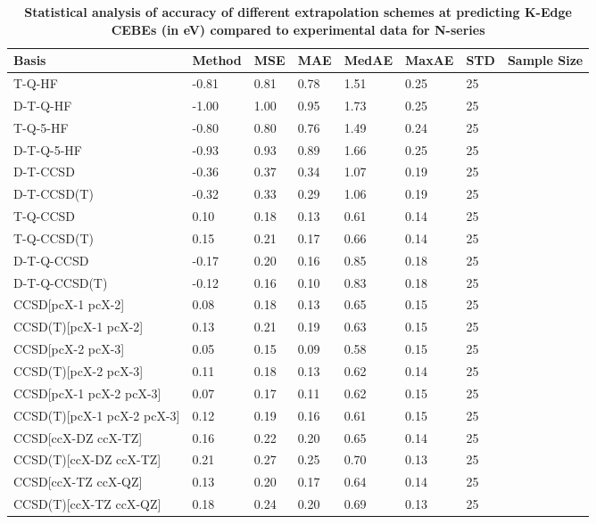 \begin{table}
  \caption{\textbf{Statistical analysis of accuracy of different extrapolation schemes at predicting K-Edge CEBEs (in eV) compared to experimental data for N-series}}
  \label{tbl:extrap-scheme-summary-n}
  \begin{tabular}{l l l l l l l l }
    \toprule
    \textbf{Basis} & \textbf{Method} & \textbf{MSE} & \textbf{MAE} & \textbf{MedAE} & \textbf{MaxAE} & \textbf{STD} & \textbf{Sample Size} \\ 
    \midrule
    T-Q-HF & -0.81 & 0.81 & 0.78 & 1.51 & 0.25 & 25 \\ 
    D-T-Q-HF & -1.00 & 1.00 & 0.95 & 1.73 & 0.25 & 25 \\ 
    T-Q-5-HF & -0.80 & 0.80 & 0.76 & 1.49 & 0.24 & 25 \\ 
    D-T-Q-5-HF & -0.93 & 0.93 & 0.89 & 1.66 & 0.25 & 25 \\ 
    D-T-CCSD & -0.36 & 0.37 & 0.34 & 1.07 & 0.19 & 25 \\ 
    D-T-CCSD(T) & -0.32 & 0.33 & 0.29 & 1.06 & 0.19 & 25 \\ 
    T-Q-CCSD & 0.10 & 0.18 & 0.13 & 0.61 & 0.14 & 25 \\ 
    T-Q-CCSD(T) & 0.15 & 0.21 & 0.17 & 0.66 & 0.14 & 25 \\ 
    D-T-Q-CCSD & -0.17 & 0.20 & 0.16 & 0.85 & 0.18 & 25 \\ 
    D-T-Q-CCSD(T) & -0.12 & 0.16 & 0.10 & 0.83 & 0.18 & 25 \\ 
    CCSD[pcX-1 pcX-2] & 0.08 & 0.18 & 0.13 & 0.65 & 0.15 & 25 \\ 
    CCSD(T)[pcX-1 pcX-2] & 0.13 & 0.21 & 0.19 & 0.63 & 0.15 & 25 \\ 
    CCSD[pcX-2 pcX-3] & 0.05 & 0.15 & 0.09 & 0.58 & 0.15 & 25 \\ 
    CCSD(T)[pcX-2 pcX-3] & 0.11 & 0.18 & 0.13 & 0.62 & 0.14 & 25 \\ 
    CCSD[pcX-1 pcX-2 pcX-3] & 0.07 & 0.17 & 0.11 & 0.62 & 0.15 & 25 \\ 
    CCSD(T)[pcX-1 pcX-2 pcX-3] & 0.12 & 0.19 & 0.16 & 0.61 & 0.15 & 25 \\ 
    CCSD[ccX-DZ ccX-TZ] & 0.16 & 0.22 & 0.20 & 0.65 & 0.14 & 25 \\ 
    CCSD(T)[ccX-DZ ccX-TZ] & 0.21 & 0.27 & 0.25 & 0.70 & 0.13 & 25 \\ 
    CCSD[ccX-TZ ccX-QZ] & 0.13 & 0.20 & 0.17 & 0.64 & 0.14 & 25 \\ 
    CCSD(T)[ccX-TZ ccX-QZ] & 0.18 & 0.24 & 0.20 & 0.69 & 0.13 & 25 \\ 

\end{tabular}
\end{table}
